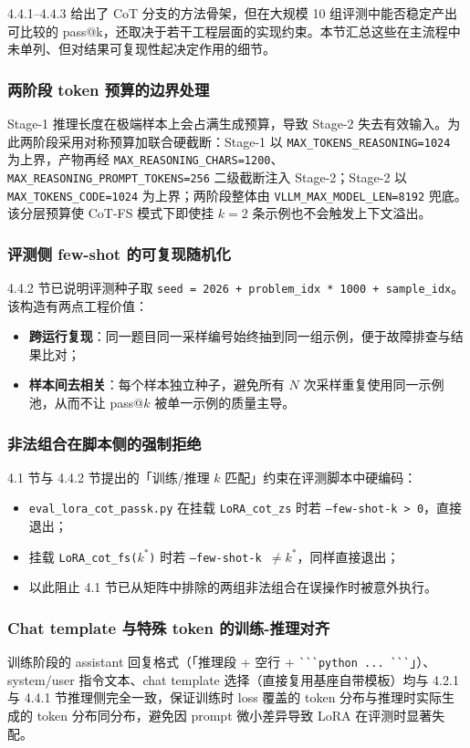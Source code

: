 
4.4.1--4.4.3 给出了 CoT 分支的方法骨架，但在大规模 10 组评测中能否稳定产出可比较的 pass@k，还取决于若干工程层面的实现约束。本节汇总这些在主流程中未单列、但对结果可复现性起决定作用的细节。

\subsubsection{两阶段 token 预算的边界处理}
Stage-1 推理长度在极端样本上会占满生成预算，导致 Stage-2 失去有效输入。为此两阶段采用对称预算加联合硬截断：Stage-1 以 \texttt{MAX\_TOKENS\_REASONING=1024} 为上界，产物再经 \texttt{MAX\_REASONING\_CHARS=1200}、\texttt{MAX\_REASONING\_PROMPT\_TOKENS=256} 二级截断注入 Stage-2；Stage-2 以 \texttt{MAX\_TOKENS\_CODE=1024} 为上界；两阶段整体由 \texttt{VLLM\_MAX\_MODEL\_LEN=8192} 兜底。该分层预算使 CoT-FS 模式下即使挂 $k{=}2$ 条示例也不会触发上下文溢出。

\subsubsection{评测侧 few-shot 的可复现随机化}
4.4.2 节已说明评测种子取 \texttt{seed = 2026 + problem\_idx * 1000 + sample\_idx}。该构造有两点工程价值：
\begin{itemize}
    \item \textbf{跨运行复现}：同一题目同一采样编号始终抽到同一组示例，便于故障排查与结果比对；
    \item \textbf{样本间去相关}：每个样本独立种子，避免所有 $N$ 次采样重复使用同一示例池，从而不让 pass@$k$ 被单一示例的质量主导。
\end{itemize}

\subsubsection{非法组合在脚本侧的强制拒绝}
4.1 节与 4.4.2 节提出的「训练/推理 $k$ 匹配」约束在评测脚本中硬编码：
\begin{itemize}
    \item \texttt{eval\_lora\_cot\_passk.py} 在挂载 \texttt{LoRA\_cot\_zs} 时若 \texttt{--few-shot-k > 0}，直接退出；
    \item 挂载 \texttt{LoRA\_cot\_fs($k^\ast$)} 时若 \texttt{--few-shot-k $\ne k^\ast$}，同样直接退出；
    \item 以此阻止 4.1 节已从矩阵中排除的两组非法组合在误操作时被意外执行。
\end{itemize}

\subsubsection{Chat template 与特殊 token 的训练-推理对齐}
训练阶段的 assistant 回复格式（「推理段 + 空行 + \verb|```python ... ```|」）、system/user 指令文本、chat template 选择（直接复用基座自带模板）均与 4.2.1 与 4.4.1 节推理侧完全一致，保证训练时 loss 覆盖的 token 分布与推理时实际生成的 token 分布同分布，避免因 prompt 微小差异导致 LoRA 在评测时显著失配。